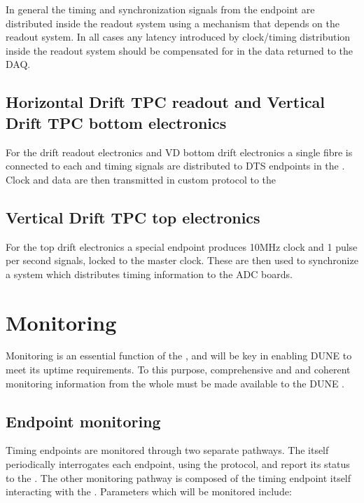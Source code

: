 \documentclass[main.tex]{subfiles}
\begin{document}
In general the timing and synchronization signals from the  endpoint are distributed inside the readout system using a mechanism that depends on the readout system. In all cases any latency introduced by clock/timing distribution inside the readout system should be compensated for in the data returned to the DAQ.

\subsection{Horizontal Drift TPC readout and Vertical Drift TPC bottom electronics}


For the  drift readout electronics and VD bottom drift electronics a single fibre is connected to each  and timing signals are distributed to DTS endpoints in the . Clock and data are then transmitted in custom protocol to the 

\subsection{Vertical Drift TPC top electronics}

For the  top drift electronics a special  endpoint produces 10MHz clock and 1 pulse per second signals, locked to the  master clock. These are then used to synchronize a  system\cite{wr_ohwr} which distributes timing information to the ADC boards.

\section{Monitoring}
Monitoring is an essential function of the , and will be key in enabling DUNE to meet its uptime requirements. To this purpose, comprehensive and and coherent monitoring information from the whole  must be made available to the DUNE .

\subsection{Endpoint monitoring}
Timing endpoints are monitored through two separate pathways. The  itself periodically interrogates each endpoint, using the  protocol, and report its status to the . The other monitoring pathway is composed of the timing endpoint itself interacting with the . Parameters which will be monitored include:
\end{document}
